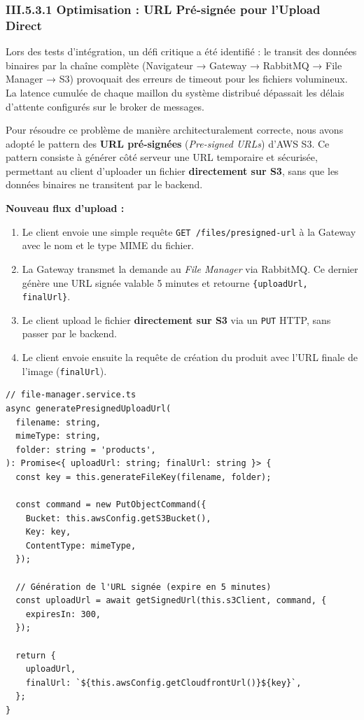 \subsubsection{III.5.3.1 Optimisation : URL Pré-signée pour l'Upload Direct}
Lors des tests d'intégration, un défi critique a été identifié : le transit des données binaires par la chaîne complète (Navigateur → Gateway → RabbitMQ → File Manager → S3) provoquait des erreurs de timeout pour les fichiers volumineux. La latence cumulée de chaque maillon du système distribué dépassait les délais d'attente configurés sur le broker de messages.

Pour résoudre ce problème de manière architecturalement correcte, nous avons adopté le pattern des \textbf{URL pré-signées} (\textit{Pre-signed URLs}) d'AWS S3. Ce pattern consiste à générer côté serveur une URL temporaire et sécurisée, permettant au client d'uploader un fichier \textbf{directement sur S3}, sans que les données binaires ne transitent par le backend.

\textbf{Nouveau flux d'upload :}
\begin{enumerate}
    \item Le client envoie une simple requête \texttt{GET /files/presigned-url} à la Gateway avec le nom et le type MIME du fichier.
    \item La Gateway transmet la demande au \textit{File Manager} via RabbitMQ. Ce dernier génère une URL signée valable 5 minutes et retourne \texttt{\{uploadUrl, finalUrl\}}.
    \item Le client upload le fichier \textbf{directement sur S3} via un \texttt{PUT} HTTP, sans passer par le backend.
    \item Le client envoie ensuite la requête de création du produit avec l'URL finale de l'image (\texttt{finalUrl}).
\end{enumerate}

\begin{verbatim}
// file-manager.service.ts
async generatePresignedUploadUrl(
  filename: string,
  mimeType: string,
  folder: string = 'products',
): Promise<{ uploadUrl: string; finalUrl: string }> {
  const key = this.generateFileKey(filename, folder);

  const command = new PutObjectCommand({
    Bucket: this.awsConfig.getS3Bucket(),
    Key: key,
    ContentType: mimeType,
  });

  // Génération de l'URL signée (expire en 5 minutes)
  const uploadUrl = await getSignedUrl(this.s3Client, command, {
    expiresIn: 300,
  });

  return {
    uploadUrl,
    finalUrl: `${this.awsConfig.getCloudfrontUrl()}${key}`,
  };
}
\end{verbatim}

